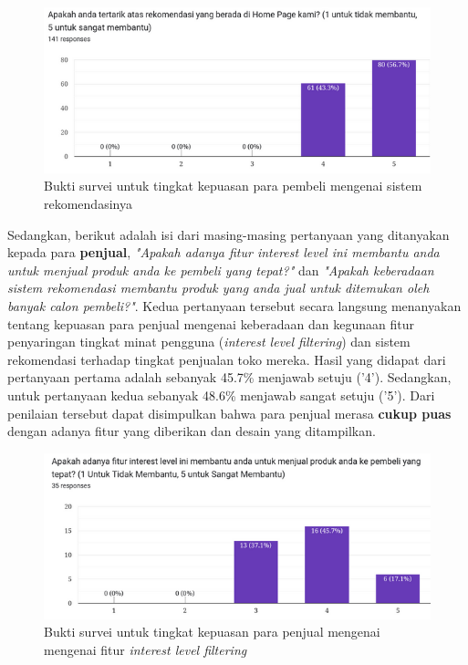 \documentclass[a4paper]{article}
\begin{document}
\begin{enumerate}
\begin{itemize}
        \begin{figure}[h]
            \centering
            \includegraphics[scale=0.50]{images/evaluasi ui user 2/Survei 2 - Pertanyaan 2.png}
            \caption{Bukti survei untuk tingkat kepuasan para pembeli mengenai sistem rekomendasinya}
            \label{fig:userSistemRekomendasi}
        \end{figure}

        Sedangkan, berikut adalah isi dari masing-masing pertanyaan yang ditanyakan kepada para \textbf{penjual}, \textit{"Apakah adanya fitur interest level ini membantu anda untuk menjual produk anda ke pembeli yang tepat?"} dan \textit{"Apakah keberadaan sistem rekomendasi membantu produk yang anda jual untuk ditemukan oleh banyak calon pembeli?"}. Kedua pertanyaan tersebut secara langsung menanyakan tentang kepuasan para penjual mengenai keberadaan dan kegunaan fitur penyaringan tingkat minat pengguna (\textit{interest level filtering}) dan sistem rekomendasi terhadap tingkat penjualan toko mereka. Hasil yang didapat dari pertanyaan pertama adalah sebanyak 45.7\% menjawab  setuju ('4'). Sedangkan, untuk pertanyaan kedua sebanyak 48.6\% menjawab sangat setuju ('5'). Dari penilaian tersebut dapat disimpulkan bahwa para penjual merasa \textbf{cukup puas} dengan adanya fitur yang diberikan dan desain yang ditampilkan. 

        \begin{figure}[h]
            \centering
            \includegraphics[scale=0.50]{images/evaluasi ui merchant 2/Survei 3 - Pertanyaan 1.png}
            \caption{Bukti survei untuk tingkat kepuasan para penjual mengenai mengenai fitur \textit{interest level filtering}}
            \label{fig:merchantInterestLevel}
        \end{figure}


\end{itemize}
\end{enumerate}
\end{document}
